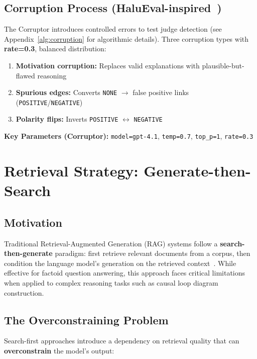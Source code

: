 \subsection{Corruption Process (HaluEval-inspired~\cite{li2023halueval})}
The Corruptor introduces controlled errors to test judge detection (see Appendix~\ref{alg:corruption} for algorithmic details). Three corruption types with \textbf{rate=0.3}, balanced distribution:
\begin{enumerate}[noitemsep]
    \item \textbf{Motivation corruption:} Replaces valid explanations with plausible-but-flawed reasoning
    \item \textbf{Spurious edges:} Converts \texttt{NONE} $\rightarrow$ false positive links (\texttt{POSITIVE}/\texttt{NEGATIVE})
    \item \textbf{Polarity flips:} Inverts \texttt{POSITIVE} $\leftrightarrow$ \texttt{NEGATIVE}
\end{enumerate}

\textbf{Key Parameters (Corruptor):} \texttt{model=gpt-4.1}, \texttt{temp=0.7}, \texttt{top\_p=1}, \texttt{rate=0.3}

\section{Retrieval Strategy: Generate-then-Search}
\label{sec:retrieval_strategy}

\subsection{Motivation}

Traditional Retrieval-Augmented Generation (RAG) systems follow a \textbf{search-then-generate} paradigm: first retrieve relevant documents from a corpus, then condition the language model's generation on the retrieved context~\cite{lewis2020rag}. While effective for factoid question answering, this approach faces critical limitations when applied to complex reasoning tasks such as causal loop diagram construction.

\subsection{The Overconstraining Problem}

Search-first approaches introduce a dependency on retrieval quality that can \textbf{overconstrain} the model's output:


